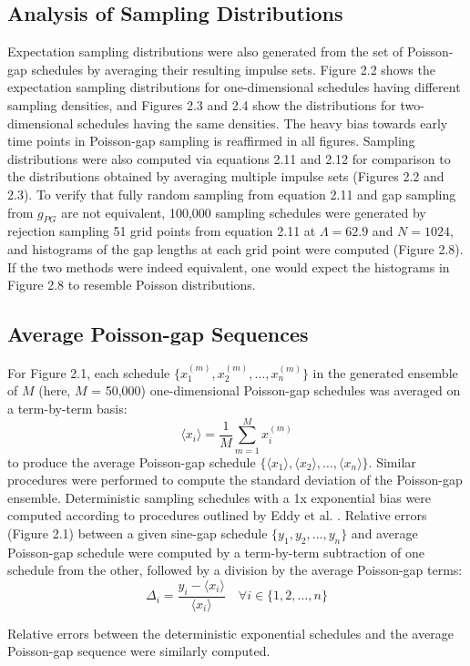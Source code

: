 \subsection{Analysis of Sampling Distributions}

\begin{doublespace}
Expectation sampling distributions were also generated from the set of
Poisson-gap schedules by averaging their resulting impulse sets. Figure 2.2
shows the expectation sampling distributions for one-dimensional schedules
having different sampling densities, and Figures 2.3 and 2.4 show the
distributions for two-dimensional schedules having the same densities.
The heavy bias towards early time points in Poisson-gap sampling is
reaffirmed in all figures. Sampling distributions were also computed via
equations 2.11 and 2.12 for comparison to the distributions obtained by
averaging multiple impulse sets (Figures 2.2 and 2.3). To verify that fully
random sampling from equation 2.11 and gap sampling from $g_{PG}$ are not
equivalent, 100,000 sampling schedules were generated by rejection sampling
51 grid points from equation 2.11 at $\Lambda=62.9$ and $N=1024$, and
histograms of the gap lengths at each grid point were computed (Figure 2.8).
If the two methods were indeed equivalent, one would expect the histograms
in Figure 2.8 to resemble Poisson distributions.
\end{doublespace}

\subsection{Average Poisson-gap Sequences}

\begin{doublespace}
For Figure 2.1, each schedule $\{x_1^{(m)}, x_2^{(m)},\dots, x_n^{(m)}\}$ in
the generated ensemble of $M$ (here, $M$ = 50,000) one-dimensional Poisson-gap
schedules was averaged on a term-by-term basis:
\begin{equation}
\langle x_i \rangle = \frac{1}{M} \sum_{m=1}^M x_i^{(m)}
\end{equation}
to produce the average Poisson-gap schedule
$\{\langle x_1 \rangle, \langle x_2 \rangle,\dots, \langle x_n \rangle\}$.
Similar procedures were performed to compute the standard deviation of the
Poisson-gap ensemble. Deterministic sampling schedules with a 1x exponential
bias were computed according to procedures outlined by
Eddy et al. \cite{eddy:jmr2012}. Relative errors (Figure 2.1) between a given
sine-gap schedule $\{y_1, y_2,\dots, y_n\}$ and average Poisson-gap schedule
were computed by a term-by-term subtraction of one schedule from the other,
followed by a division by the average Poisson-gap terms:
\begin{equation}
\Delta_i = \frac{y_i - \langle x_i \rangle}{\langle x_i \rangle}
 \quad \forall i \in \{1,2,\dots, n\}
\end{equation}

Relative errors between the deterministic exponential schedules and the
average Poisson-gap sequence were similarly computed.
\end{doublespace}


